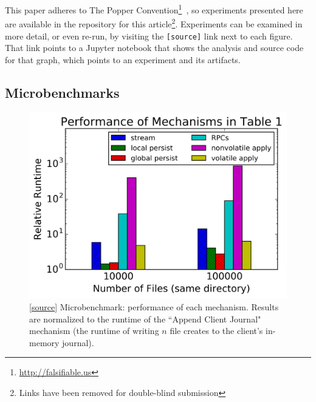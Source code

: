
This paper adheres to The Popper
Convention\footnote{\url{http://falsifiable.us}}~\cite{jimenez_popper_2016}, so
experiments presented here are available in the repository for this
article\footnote{Links have been removed for double-blind submission}.
Experiments can be examined in more detail, or even re-run, by visiting the
\texttt{[source]} link next to each figure. That link points to a Jupyter
notebook that shows the analysis and source code for that graph, which points
to an experiment and its artifacts.


\subsection{Microbenchmarks}
\begin{figure}[tb]
\centering
\includegraphics[width=1.0\linewidth]{graphs/slowdown-mechanisms.png}
\caption{ [\href{https://...}{source}] Microbenchmark: performance of each
mechanism. Results are normalized to the runtime of the ``Append Client
Journal" mechanism (the runtime of writing \(n\) file creates to the client's
in-memory journal).  \label{fig:slowdown-mechanisms}}
\end{figure}

